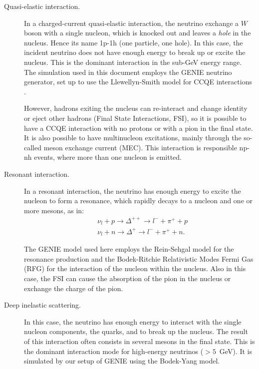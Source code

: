 \begin{description}
\item[Quasi-elastic interaction.] In a charged-current quasi-elastic interaction, the neutrino exchange a $W$ boson with a single nucleon, which is knocked out and leaves a \emph{hole} in the nucleus. Hence its name 1p-1h (one particle, one hole). In this case, the incident neutrino does not have enough energy to break up or excite the nucleus. This is the dominant interaction in the sub-GeV energy range. The simulation used in this document employs the GENIE neutrino generator, set up to use the Llewellyn-Smith model for CCQE interactions \cite{LlewellynSmith:1971uhs}.

However, hadrons exiting the nucleus can re-interact and change identity or eject other hadrons (Final State Interactions, FSI), so it is possible to have a CCQE interaction with no protons or with a pion in the final state. It is also possible to have multinucleon excitations, mainly through the so-called meson exchange current (MEC). This interaction is responsible np-nh events, where more than one nucleon is emitted.

\item[Resonant interaction.] In a resonant interaction, the neutrino has enough energy to excite the nucleon to form a resonance, which rapidly decays to a nucleon and one or more mesons, as in:
\begin{align}
&\nu_l + p \rightarrow \Delta^{++} \rightarrow l^- + \pi^+ + p \\
&\nu_l + n \rightarrow \Delta^{+} \rightarrow l^- + \pi^+ + n.
\end{align}

The GENIE model used here employs the Rein-Sehgal model for the resonance production and the Bodek-Ritchie Relativistic Modes Fermi Gas (RFG) for the interaction of the nucleon within the nucleus. Also in this case, the FSI can cause the absorption of the pion in the nucleus or exchange the charge of the pion.

\item[Deep inelastic scattering.] In this case, the neutrino has enough energy to interact with the single nucleon components, the quarks, and to break up the nucleus. The result of this interaction often consists in several mesons in the final state. This is the dominant interaction mode for high-energy neutrinos ($>5$~GeV). It is simulated by our setup of GENIE using the Bodek-Yang model.
\end{description}
